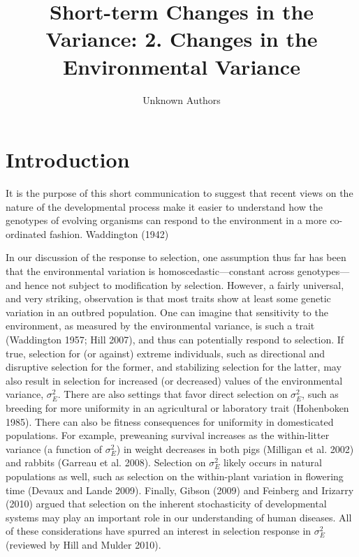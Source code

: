 \documentclass{article}
\title{Short-term Changes in the Variance:
2. Changes in the Environmental Variance}
\author{Unknown Authors}
\date{}
\begin{document}
\maketitle

\begin{abstract}

\end{abstract}

\section{Introduction}
It is the purpose of this short communication to suggest that recent views on the nature of the developmental process make it easier to understand how the genotypes of evolving organisms can respond to the environment in a more co-ordinated fashion. Waddington (1942)

In our discussion of the response to selection, one assumption thus far has been that the environmental variation is homoscedastic—constant across genotypes—and hence not subject to modification by selection. However, a fairly universal, and very striking, observation is that most traits show at least some genetic variation in an outbred population. One can imagine that sensitivity to the environment, as measured by the environmental variance, is such a trait (Waddington 1957; Hill 2007), and thus can potentially respond to selection. If true, selection for (or against) extreme individuals, such as directional and disruptive selection for the former, and stabilizing selection for the latter, may also result in selection for increased (or decreased) values of the environmental variance,  $ \sigma_{E}^{2} $. There are also settings that favor direct selection on  $ \sigma_{E}^{2} $, such as breeding for more uniformity in an agricultural or laboratory trait (Hohenboken 1985). There can also be fitness consequences for uniformity in domesticated populations. For example, preweaning survival increases as the within-litter variance (a function of  $ \sigma_{E}^{2} $) in weight decreases in both pigs (Milligan et al. 2002) and rabbits (Garreau et al. 2008). Selection on  $ \sigma_{E}^{2} $ likely occurs in natural populations as well, such as selection on the within-plant variation in flowering time (Devaux and Lande 2009). Finally, Gibson (2009) and Feinberg and Irizarry (2010) argued that selection on the inherent stochasticity of developmental systems may play an important role in our understanding of human diseases. All of these considerations have spurred an interest in selection response in  $ \sigma_{E}^{2} $ (reviewed by Hill and Mulder 2010).
\end{document}
